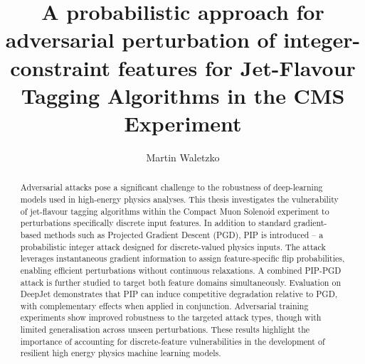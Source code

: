 \documentclass[12pt]{caltech_thesis}
\begin{document}
\title{\textbf{A probabilistic approach for adversarial perturbation of integer-constraint features for Jet-Flavour Tagging Algorithms in the CMS Experiment}}
\author{Martin Waletzko}




\maketitle

\begin{acknowledgements}
\end{acknowledgements}

\begin{abstract}

Adversarial attacks pose a significant challenge to the robustness of deep-learning models used in high-energy physics analyses. This thesis investigates the vulnerability of jet-flavour tagging algorithms within the Compact Muon Solenoid experiment to perturbations specifically discrete input features. In addition to standard gradient-based methods such as Projected Gradient Descent (PGD), PIP is introduced – a probabilistic integer attack designed for discrete-valued physics inputs. The attack leverages instantaneous gradient information to assign feature-specific flip probabilities, enabling efficient perturbations without continuous relaxations. A combined PIP-PGD attack is further studied to target both feature domains simultaneously. Evaluation on DeepJet demonstrates that PIP can induce competitive degradation relative to PGD, with complementary effects when applied in conjunction. Adversarial training experiments show improved robustness to the targeted attack types, though with limited generalisation across unseen perturbations. These results highlight the importance of accounting for discrete-feature vulnerabilities in the development of resilient high energy physics machine learning models.

\vfill
\noindent{}

\end{abstract}
\end{document}
